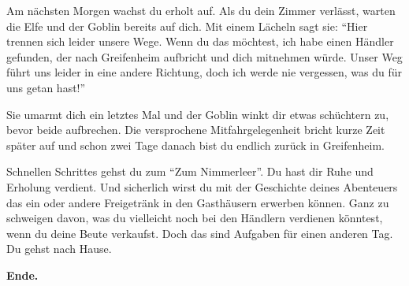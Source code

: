 Am nächsten Morgen wachst du erholt auf. Als du dein Zimmer verlässt, warten die Elfe und der Goblin bereits auf dich. Mit einem Lächeln sagt sie: ``Hier trennen sich leider unsere Wege. Wenn du das möchtest, ich habe einen Händler gefunden, der nach Greifenheim aufbricht und dich mitnehmen würde. Unser Weg führt uns leider in eine andere Richtung, doch ich werde nie vergessen, was du für uns getan hast!''

Sie umarmt dich ein letztes Mal und der Goblin winkt dir etwas schüchtern zu, bevor beide aufbrechen. Die versprochene Mitfahrgelegenheit bricht kurze Zeit später auf und schon zwei Tage danach bist du endlich zurück in Greifenheim.

Schnellen Schrittes gehst du zum ``Zum Nimmerleer''. Du hast dir Ruhe und Erholung verdient. Und sicherlich wirst du mit der Geschichte deines Abenteuers das ein oder andere Freigetränk in den Gasthäusern erwerben können. Ganz zu schweigen davon, was du vielleicht noch bei den Händlern verdienen könntest, wenn du deine Beute verkaufst. Doch das sind Aufgaben für einen anderen Tag. Du gehst nach Hause.

\textbf{Ende.}
